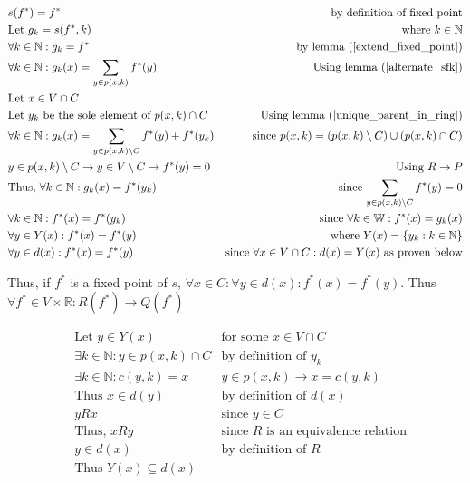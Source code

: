 \documentclass[11pt]{article}
\begin{document}
\begin{align*}
& \text{$s(f^{*})=f^{*}$} & \text{by definition of fixed point} \\
& \text{Let $g_{k} = s(f^{*},k)$} & \text{where $k\in \mathbb{N}$} \\
& \text{$\forall k \in \mathbb{N}: g_{k} = f^{*}$} & \text{by lemma (\ref{extend_fixed_point})} \\
& \text{$\forall k \in \mathbb{N}: g_{k}(x) = \sum_{y \in p(x,k)} f^{*}(y)$} & \text{Using lemma (\ref{alternate_sfk})} \\
& \text{Let $x \in V \cap C$} & \text{} \\
& \text{Let $y_{k}$ be the sole element of $p(x,k)\cap C$} & \text{Using lemma (\ref{unique_parent_in_ring})} \\
& \text{$\forall k \in \mathbb{N}: g_{k}(x) = \sum_{y \in p(x,k) \setminus C} f^{*}(y) + f^{*}(y_{k})$} & \text{since $p(x,k) = (p(x,k)\setminus C) \cup (p(x,k)\cap C)$} \\
& \text{$y \in p(x,k)\setminus C \rightarrow y \in V\setminus C \rightarrow f^{*}(y) = 0$} & \text{Using $R\rightarrow P$} \\
& \text{Thus, $\forall k \in \mathbb{N}: g_{k}(x) = f^{*}(y_{k})$} & \text{since $\sum_{y \in p(x,k) \setminus C} f^{*}(y)= 0$} \\
& \text{$\forall k \in \mathbb{N}: f^{*}(x) = f^{*}(y_{k})$} & \text{since $\forall k \in \mathbb{W}: f^{*}(x) = g_{k}(x)$} \\
& \text{$\forall y \in Y(x): f^{*}(x) = f^{*}(y)$} & \text{where $Y(x) = \{y_{k}:k \in \mathbb{N}\}$} \\
& \text{$\forall y \in d(x): f^{*}(x) = f^{*}(y)$} & \text{since $\forall x \in V \cap C: d(x)=Y(x)$ as proven below}
\end{align*}

Thus, if $f^{*}$ is a fixed point of $s$, $\forall x \in C: \forall y \in d(x): f^{*}(x) = f^{*}(y)$. Thus $\forall f^{*} \in V \times \mathbb{R}: R(f^{*}) \rightarrow Q(f^{*})$


\begin{align*}
& \text{Let $y\in Y(x)$} & \text{for some $x \in V \cap C$} \\
& \text{$\exists k \in \mathbb{N}: y \in p(x,k) \cap C$} & \text{by definition of $y_{k}$} \\
& \text{$\exists k \in \mathbb{N}: c(y,k)=x$} & \text{$y \in p(x,k) \rightarrow x=c(y,k)$} \\
& \text{Thus $x \in d(y)$} & \text{by definition of $d(x)$} \\
& \text{$yRx$} & \text{since $y\in C$} \\
& \text{Thus, $xRy$} & \text{since $R$ is an equivalence relation} \\
& \text{$y \in d(x)$} & \text{by definition of $R$} \\
& \text{Thus $Y(x) \subseteq d(x)$} & \text{}
\end{align*}
\end{document}
